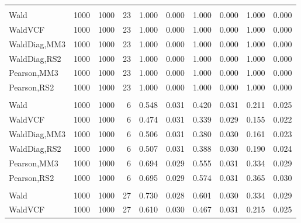 \documentclass[
]{article}
\begin{document}
\begin{table}[H]
{\begin{tabular}[t]{lrrrrrrlrr}
\addlinespace[0.3em]
\multicolumn{10}{l}{\textbf{1F 15V}}\\
\hspace{1em}Wald & 1000 & 1000 & 23 & 1.000 & 0.000 & 1.000 & 0.000 & 1.000 & 0.000\\
\hspace{1em}WaldVCF & 1000 & 1000 & 23 & 1.000 & 0.000 & 1.000 & 0.000 & 1.000 & 0.000\\
\hspace{1em}WaldDiag,MM3 & 1000 & 1000 & 23 & 1.000 & 0.000 & 1.000 & 0.000 & 1.000 & 0.000\\
\hspace{1em}WaldDiag,RS2 & 1000 & 1000 & 23 & 1.000 & 0.000 & 1.000 & 0.000 & 1.000 & 0.000\\
\hspace{1em}Pearson,MM3 & 1000 & 1000 & 23 & 1.000 & 0.000 & 1.000 & 0.000 & 1.000 & 0.000\\
\hspace{1em}Pearson,RS2 & 1000 & 1000 & 23 & 1.000 & 0.000 & 1.000 & 0.000 & 1.000 & 0.000\\
\addlinespace[0.3em]
\multicolumn{10}{l}{\textbf{2F 10V}}\\
\hspace{1em}Wald & 1000 & 1000 & 6 & 0.548 & 0.031 & 0.420 & 0.031 & 0.211 & 0.025\\
\hspace{1em}WaldVCF & 1000 & 1000 & 6 & 0.474 & 0.031 & 0.339 & 0.029 & 0.155 & 0.022\\
\hspace{1em}WaldDiag,MM3 & 1000 & 1000 & 6 & 0.506 & 0.031 & 0.380 & 0.030 & 0.161 & 0.023\\
\hspace{1em}WaldDiag,RS2 & 1000 & 1000 & 6 & 0.507 & 0.031 & 0.388 & 0.030 & 0.190 & 0.024\\
\hspace{1em}Pearson,MM3 & 1000 & 1000 & 6 & 0.694 & 0.029 & 0.555 & 0.031 & 0.334 & 0.029\\
\hspace{1em}Pearson,RS2 & 1000 & 1000 & 6 & 0.695 & 0.029 & 0.574 & 0.031 & 0.365 & 0.030\\
\addlinespace[0.3em]
\multicolumn{10}{l}{\textbf{3F 15V}}\\
\hspace{1em}Wald & 1000 & 1000 & 27 & 0.730 & 0.028 & 0.601 & 0.030 & 0.334 & 0.029\\
\hspace{1em}WaldVCF & 1000 & 1000 & 27 & 0.610 & 0.030 & 0.467 & 0.031 & 0.215 & 0.025\\

\end{tabular}}
\end{table}
\end{document}
